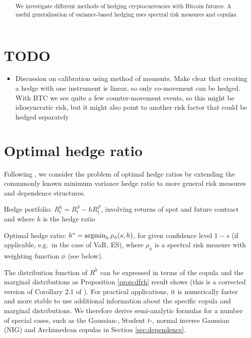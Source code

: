 \documentclass[square]{article} %
\theoremstyle{plain}
\theoremstyle{definition} %
\begin{document}
\setlength{\boxlength}{0.95\textwidth} %
\title{\large{\bf{}}} %
\author{{\normalsize\bf{}}}%
\thispagestyle{empty}
\addtocounter{page}{1}
\maketitle
\begin{abstract}
  We investigate different methods of hedging cryptocurrencies with
  Bitcoin futures. A useful generalisation of variance-based hedging
  uses spectral risk measures and copulas. 
\end{abstract}
\vspace{.5cm}
\def\contentsname{Contents}
\tableofcontents
\vspace{.5cm}

\section{TODO}
\label{sec:todo}

\begin{itemize}
\item Discussion on calibration using method of moments. Make clear
  that creating a hedge with one instrument is linear, so only
  co-movement can be hedged. With BTC we see quite a few
  counter-movement events, so this might be idiosyncratic risk, but it
  might also point to another risk factor that could be hedged separately
\end{itemize}

\section{Optimal hedge ratio}
\label{sec:optimal-hedge-ratio}

Following \citep{Barbi2014}, we consider the problem of optimal
hedge ratios by extending the commmonly known minimum variance hedge
ratio to more general risk measures and dependence
structures.\medskip

Hedge portfolio: $R_t^h = R_t^S - h R_t^F$, involving returns of spot
and future contract and where $h$ is the hedge ratio

Optimal hedge ratio: $h^\ast = \argmin_h \rho_\phi(s,h)$, for given
confidence level $1-s$ (if applicable, e.g.\ in the case of VaR, ES),
where $\rho_\phi$ is a spectral risk measure with weighting function
$\phi$ (see below).

The distribution function of $R^h$ can be expressed in terms of the
copula and the marginal distributions as Proposition \ref{prop:dfrh}
result shows (this is a corrected version of Corollary 2.1 of
\citep{Barbi2014}). For practical applications, it is numerically
faster and more stable to use additional information about the
specific copula and marginal distributions. We therefore derive
semi-analytic formulas for a number of special cases, such as the
Gaussian-, Student $t$-, normal inverse Gaussian (NIG) and Archimedean
copulas in Section \ref{sec:dependence}. 
\end{document}
